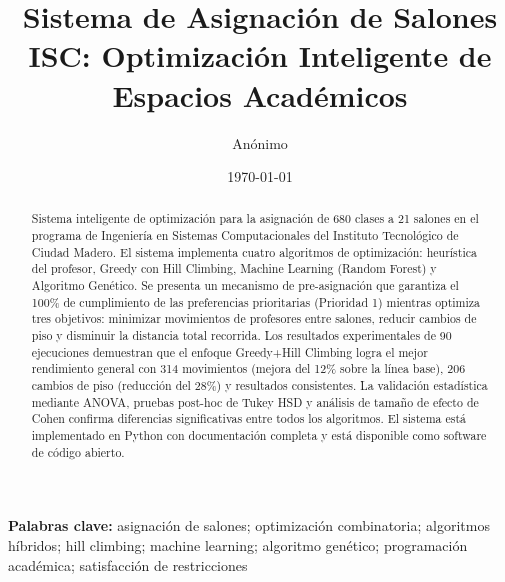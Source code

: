 \documentclass[12pt,a4paper]{article}
\title{Sistema de Asignación de Salones ISC: Optimización Inteligente de Espacios Académicos}
\author{Anónimo}
\date{\today}
\begin{document}
\maketitle

\begin{abstract}
Sistema inteligente de optimización para la asignación de 680 clases a 21 salones en el programa de Ingeniería en Sistemas Computacionales del Instituto Tecnológico de Ciudad Madero. El sistema implementa cuatro algoritmos de optimización: heurística del profesor, Greedy con Hill Climbing, Machine Learning (Random Forest) y Algoritmo Genético. Se presenta un mecanismo de pre-asignación que garantiza el 100\% de cumplimiento de las preferencias prioritarias (Prioridad 1) mientras optimiza tres objetivos: minimizar movimientos de profesores entre salones, reducir cambios de piso y disminuir la distancia total recorrida. Los resultados experimentales de 90 ejecuciones demuestran que el enfoque Greedy+Hill Climbing logra el mejor rendimiento general con 314 movimientos (mejora del 12\% sobre la línea base), 206 cambios de piso (reducción del 28\%) y resultados consistentes. La validación estadística mediante ANOVA, pruebas post-hoc de Tukey HSD y análisis de tamaño de efecto de Cohen confirma diferencias significativas entre todos los algoritmos. El sistema está implementado en Python con documentación completa y está disponible como software de código abierto.
\end{abstract}

\textbf{Palabras clave:} asignación de salones; optimización combinatoria; algoritmos híbridos; hill climbing; machine learning; algoritmo genético; programación académica; satisfacción de restricciones

\tableofcontents
\newpage



\end{document}
